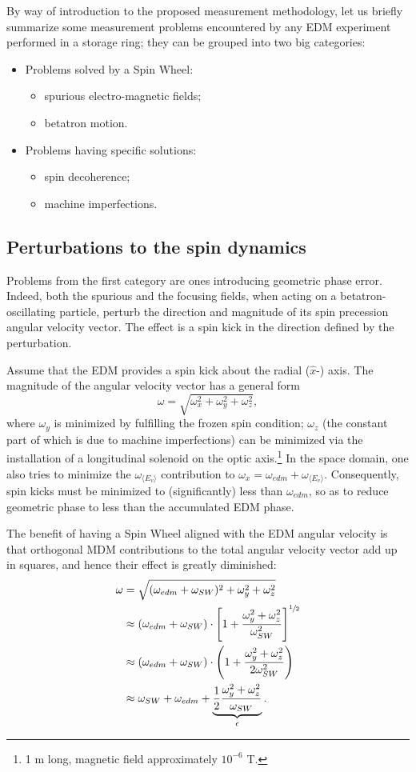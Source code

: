 \documentclass[]{elsarticle}
\newcommand{\w}{\omega}
\newcommand{\avg}[1]{\langle{#1}\rangle}
\newcommand{\wedm}{\w_{edm}}
\newcommand{\wimp}{\w_{\avg{E_v}}}
\newcommand{\wsw}{\w_{SW}}
\begin{document}
By way of introduction to the proposed measurement methodology, let us briefly summarize some measurement problems
encountered by any EDM experiment performed in a storage ring; they can be grouped into two big categories:
\begin{itemize}
\item Problems solved by a Spin Wheel:
  \begin{itemize}
  \item spurious electro-magnetic fields;
  \item betatron motion.
  \end{itemize}
\item Problems having specific solutions:
  \begin{itemize}
  \item spin decoherence;
  \item machine imperfections.
  \end{itemize}
\end{itemize}

\subsection{Perturbations to the spin dynamics}
Problems from the first category are ones introducing geometric phase error. Indeed, both the spurious 
and the focusing fields, when acting on a betatron-oscillating particle, perturb the direction and
magnitude of its spin precession angular velocity vector. The effect is a spin kick in the direction defined
by the perturbation.

Assume that the EDM provides a spin kick about the radial ($\hat x$-) axis. The magnitude of the angular
velocity vector has a general form
\[
  \w = \sqrt{\w_x^2 + \w_y^2 + \w_z^2},
\]
where $\w_y$ is minimized by fulfilling the frozen spin condition; $\w_z$ (the constant part of which is
due to machine imperfections) can be minimized via the installation
of a longitudinal solenoid on the optic axis.\footnote{1 m long, magnetic field approximately $10^{-6}$ T.} In the
space domain, one also tries to minimize the $\wimp$ contribution to $\w_x = \wedm + \wimp$. Consequently,
spin kicks must be minimized to (significantly) less than $\wedm$, so as to reduce geometric phase to
less than the accumulated EDM phase.

The benefit of having a Spin Wheel aligned with the EDM angular velocity is that orthogonal MDM contributions
to the total angular velocity vector add up in squares, and hence their effect is greatly diminished:
\begin{align*}
  \w &= \sqrt{(\wedm + \wsw)^2 + \w_y^2 + \w_z^2} \\
     &\approx(\wedm + \wsw)\cdot \bkt*{1 + \frac{\w_y^2 + \w_z^2}{\wsw^2}}^{\sfrac12} \\
     &\approx (\wedm + \wsw)\cdot \bkt{1 + \frac{\w_y^2 + \w_z^2}{2\wsw^2}} \\
     &\approx \wsw + \wedm + \underbrace{\frac12\frac{\w_y^2 + \w_z^2}{\wsw}}_{\epsilon}.
\end{align*}
\end{document}

